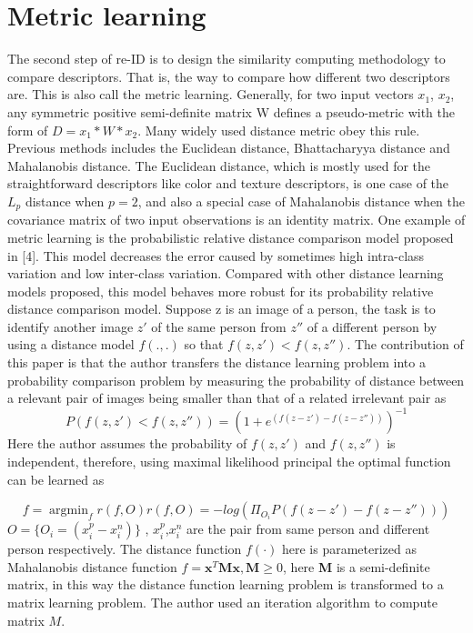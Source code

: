 \section{Metric learning}
The second step of re-ID is to design the similarity computing methodology to compare descriptors. That is, the way to compare how different two descriptors are. This is also call the metric learning. Generally, for two input vectors $x_1$, $x_2$, any symmetric positive semi-definite matrix W defines a pseudo-metric with the form of $D = x_1*W*x_2$. Many widely used distance metric obey this rule. Previous methods includes the Euclidean distance, Bhattacharyya distance and Mahalanobis distance. The Euclidean distance, which is mostly used for the straightforward descriptors like color and texture descriptors,  is one case of the $L_p$ distance when $p=2$, and also a special case of Mahalanobis distance when the covariance matrix of two input observations is an identity matrix. One example of metric learning is the probabilistic relative distance comparison model proposed in [4]. This model decreases the error caused by sometimes high intra-class variation and low inter-class variation. Compared with other distance learning models proposed, this model behaves more robust for its probability relative distance comparison model. Suppose z is an image of a person, the task is to identify another image $z'$ of the same person from $z''$ of a different person by using a distance model $f(.,.)$ so that $f(z, z')< f(z, z'')$. The contribution of this paper is that the author transfers the distance learning problem into a probability comparison problem by measuring the probability of distance between a relevant pair of images being smaller than that of a related irrelevant pair as
\begin{equation}P(f(z,z')<f(z,z'')) = (1+e^{(f(z-z')-f(z-z''))})^{-1}\end{equation}
Here the author assumes the probability of $f(z,z')$ and $f(z,z'')$ is independent, therefore, using maximal likelihood principal the optimal function can be learned as

\begin{equation}
f = \mathop{\arg\min}_f r(f,O) 
r(f,O) = -log(\Pi_{O_i}P(f(z-z')-f(z-z'')))
\end{equation}
$O=\{O_i=(x_i^p-x_i^n)\}$ , $x_i^p$,$x_i^n$ are the pair from same person and different person respectively.
The distance function $f(\cdot)$ here is parameterized as Mahalanobis distance function
$f=\bm{x}^T\bm{M}\bm{x},\bm{M}\ge0$,
here \textbf{M} is a semi-definite matrix, in this way the distance function learning problem is transformed to a matrix learning problem. The author used an iteration algorithm to compute matrix $M$.

